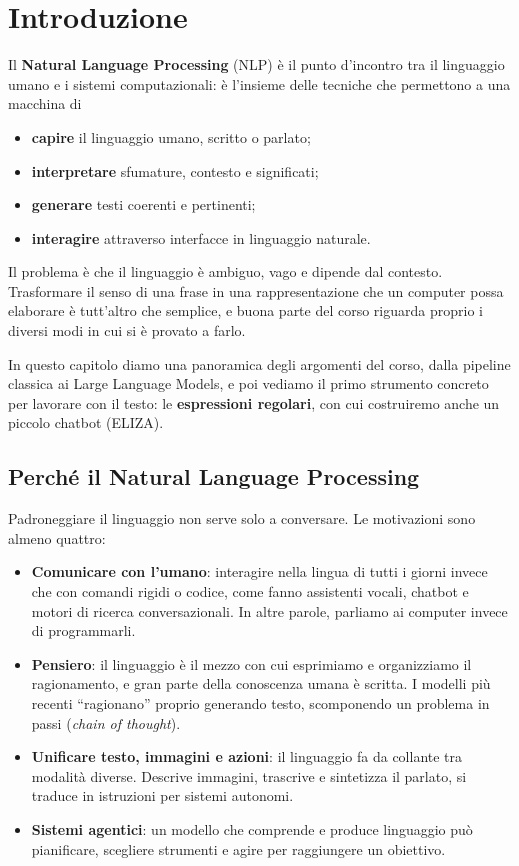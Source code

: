 \chapter{Introduzione}\label{ch:intro}
Il \textbf{Natural Language Processing} (NLP) è il punto d'incontro tra il linguaggio umano e i sistemi computazionali: è l'insieme delle tecniche che permettono a una macchina di
\begin{itemize}
    \item \textbf{capire} il linguaggio umano, scritto o parlato;
    \item \textbf{interpretare} sfumature, contesto e significati;
    \item \textbf{generare} testi coerenti e pertinenti;
    \item \textbf{interagire} attraverso interfacce in linguaggio naturale.
\end{itemize}
Il problema è che il linguaggio è ambiguo, vago e dipende dal contesto. Trasformare il senso di una frase in una rappresentazione che un computer possa elaborare è tutt'altro che semplice, e buona parte del corso riguarda proprio i diversi modi in cui si è provato a farlo.

In questo capitolo diamo una panoramica degli argomenti del corso, dalla pipeline classica ai Large Language Models, e poi vediamo il primo strumento concreto per lavorare con il testo: le \textbf{espressioni regolari}, con cui costruiremo anche un piccolo chatbot (ELIZA).

\section{Perché il Natural Language Processing}
Padroneggiare il linguaggio non serve solo a conversare. Le motivazioni sono almeno quattro:
\begin{itemize}
    \item \textbf{Comunicare con l'umano}: interagire nella lingua di tutti i giorni invece che con comandi rigidi o codice, come fanno assistenti vocali, chatbot e motori di ricerca conversazionali. In altre parole, parliamo ai computer invece di programmarli.
    \item \textbf{Pensiero}: il linguaggio è il mezzo con cui esprimiamo e organizziamo il ragionamento, e gran parte della conoscenza umana è scritta. I modelli più recenti \enquote{ragionano} proprio generando testo, scomponendo un problema in passi (\textit{chain of thought}).
    \item \textbf{Unificare testo, immagini e azioni}: il linguaggio fa da collante tra modalità diverse. Descrive immagini, trascrive e sintetizza il parlato, si traduce in istruzioni per sistemi autonomi.
    \item \textbf{Sistemi agentici}: un modello che comprende e produce linguaggio può pianificare, scegliere strumenti e agire per raggiungere un obiettivo.
\end{itemize}

